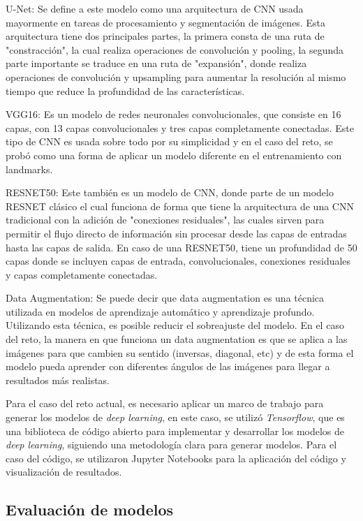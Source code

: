 \documentclass[runningheads]{llncs}
\begin{document}
U-Net: Se define a este modelo como una arquitectura de CNN usada mayormente en tareas de procesamiento y segmentación de imágenes. Esta arquitectura tiene dos principales partes, la primera consta de una ruta de "constracción", la cual realiza operaciones de convolución y pooling, la segunda parte importante se traduce en una ruta de "expansión", donde realiza operaciones de convolución y upsampling para aumentar la resolución al mismo tiempo que reduce la profundidad de las características. \citep{ronneberger2015unet}

VGG16:  Es un modelo de redes neuronales convolucionales, que consiste en 16 capas, con 13 capas convolucionales y tres capas completamente conectadas. Este tipo de CNN es usada sobre todo por su simplicidad y en el caso del reto, se probó como una forma de aplicar un modelo diferente en el entrenamiento con landmarks. \citep{geeksforgeeks2023}

RESNET50: Este también es un modelo de CNN, donde parte de un modelo RESNET clásico el cual funciona de forma que tiene la arquitectura de una CNN tradicional con la adición de "conexiones residuales", las cuales sirven para permitir el flujo directo de información sin procesar desde las capas de entradas hasta las capas de salida. En caso de una RESNET50, tiene un profundidad de 50 capas donde se incluyen capas de entrada, convolucionales, conexiones residuales y capas completamente conectadas.  \cite{boesch2023resnet}

Data Augmentation: Se puede decir que data augmentation es una técnica utilizada en modelos de aprendizaje automático y aprendizaje profundo. Utilizando esta técnica, es posible reducir el sobreajuste del modelo. En el caso del reto, la manera en que funciona un data augmentation es que se aplica a las imágenes para que cambien su sentido (inversas, diagonal, etc) y de esta forma el modelo pueda aprender con diferentes ángulos de las imágenes para llegar a resultados más realistas.  \citep{awan2022dataaugmentation}

Para el caso del reto actual, es necesario aplicar un marco de trabajo para generar los modelos de \textit{deep learning}, en este caso, se utilizó \textit{Tensorflow}, que es una biblioteca de código abierto para implementar y desarrollar los modelos de \textit{deep learning}, siguiendo una metodología clara para generar modelos. Para el caso del código, se utilizaron Jupyter Notebooks para la aplicación del código y visualización de resultados.


\subsection{Evaluación de modelos}
\end{document}
